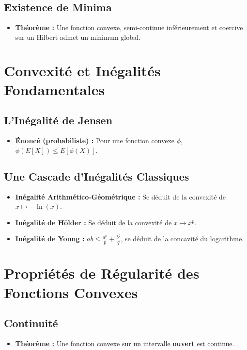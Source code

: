 \documentclass[12pt, a4paper, parskip=full]{report}
\theoremstyle{agregstyle}
\begin{document}
\subsection{Existence de Minima}
\begin{itemize}
    \item \textbf{Théorème :} Une fonction convexe, semi-continue inférieurement et coercive sur un Hilbert admet un minimum global.
\end{itemize}

\section{Convexité et Inégalités Fondamentales}
\subsection{L'Inégalité de Jensen}
\begin{itemize}
    \item \textbf{Énoncé (probabiliste) :} Pour une fonction convexe $\phi$, $\phi(E[X]) \le E[\phi(X)]$.
\end{itemize}
\subsection{Une Cascade d'Inégalités Classiques}
\begin{itemize}
    \item \textbf{Inégalité Arithmético-Géométrique :} Se déduit de la convexité de $x \mapsto -\ln(x)$.
    \item \textbf{Inégalité de Hölder :} Se déduit de la convexité de $x \mapsto x^p$.
    \item \textbf{Inégalité de Young :} $ab \le \frac{a^p}{p} + \frac{b^q}{q}$, se déduit de la concavité du logarithme.
\end{itemize}

\section{Propriétés de Régularité des Fonctions Convexes}
\subsection{Continuité}
\begin{itemize}
    \item \textbf{Théorème :} Une fonction convexe sur un intervalle \textbf{ouvert} est continue.
\end{itemize}
\end{document}
